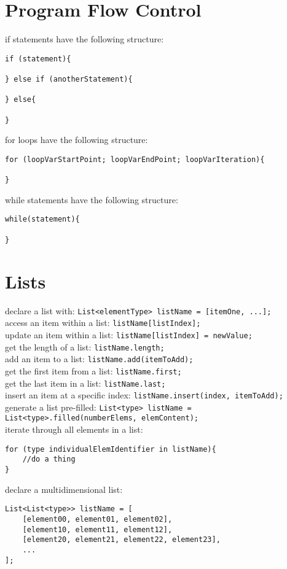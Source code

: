 \documentclass[a4paper,11pt]{article}
\begin{document}
\section{Program Flow Control}
if statements have the following structure:
\begin{verbatim}
if (statement){

} else if (anotherStatement){

} else{

}
\end{verbatim}
for loops have the following structure:
\begin{verbatim}
for (loopVarStartPoint; loopVarEndPoint; loopVarIteration){

}
\end{verbatim}
while statements have the following structure:
\begin{verbatim}
while(statement){

}
\end{verbatim}

\section{Lists}
declare a list with: \verb|List<elementType> listName = [itemOne, ...];|\\
access an item within a list: \verb|listName[listIndex];|\\
update an item within a list: \verb|listName[listIndex] = newValue;|\\
get the length of a list: \verb|listName.length;|\\
add an item to a list: \verb|listName.add(itemToAdd);|\\
get the first item from a list: \verb|listName.first;|\\
get the last item in a list: \verb|listName.last;|\\
insert an item at a specific index: \verb|listName.insert(index, itemToAdd);|\\
generate a list pre-filled: \verb|List<type> listName = List<type>.filled(numberElems, elemContent);|\\
iterate through all elements in a list:
\begin{verbatim}
for (type individualElemIdentifier in listName){
    //do a thing
}
\end{verbatim}
declare a multidimensional list:
\begin{verbatim}
List<List<type>> listName = [
    [element00, element01, element02],
    [element10, element11, element12],
    [element20, element21, element22, element23],
    ...
];
\end{verbatim}
\end{document}
